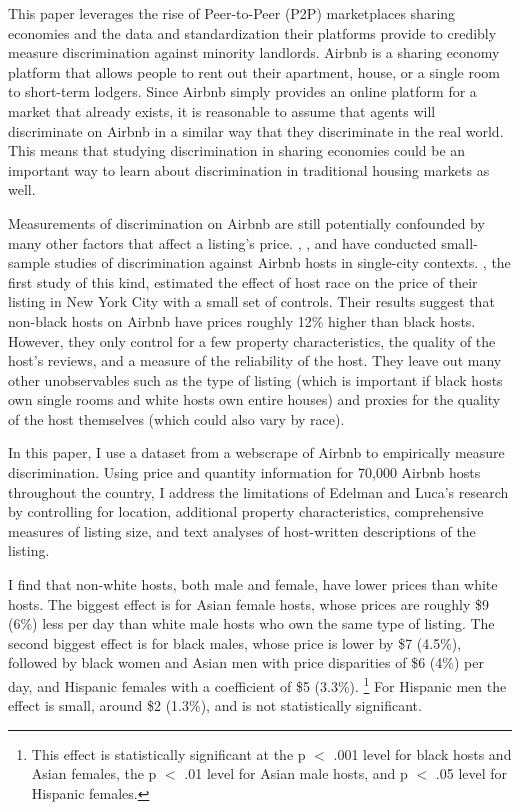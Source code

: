 This paper leverages the rise of Peer-to-Peer (P2P) marketplaces sharing economies and the data and standardization their platforms provide to credibly measure discrimination against minority landlords. Airbnb is a sharing economy platform that allows people to rent out their apartment, house, or a single room to short-term lodgers. Since Airbnb simply provides an online platform for a market that already exists, it is reasonable to assume that agents will discriminate on Airbnb in a similar way that they discriminate in the real world. This means that studying discrimination in sharing economies could be an important way to learn about discrimination in traditional housing markets as well.

Measurements of discrimination on Airbnb are still potentially confounded by many other factors that affect a listing's price. \cite{edelman}, \cite{wang}, and \cite{kakar} have conducted small-sample studies of discrimination against Airbnb hosts in single-city contexts. \cite{edelman}, the first study of this kind, estimated the effect of host race on the price of their listing in New York City with a small set of controls. Their results suggest that non-black hosts on Airbnb have prices roughly 12\% higher than black hosts. However, they only control for a few property characteristics, the quality of the host's reviews, and a measure of the reliability of the host. They leave out many other unobservables such as the type of listing (which is important if black hosts own single rooms and white hosts own entire houses) and proxies for the quality of the host themselves (which could also vary by race). 

In this paper, I use a dataset from a webscrape of Airbnb to empirically measure discrimination. Using price and quantity information for 70,000 Airbnb hosts throughout the country, I address the limitations of Edelman and Luca's research by controlling for location, additional property characteristics, comprehensive measures of listing size, and text analyses of host-written descriptions of the listing. 

I find that non-white hosts, both male and female, have lower prices than white hosts. The biggest effect is for Asian female hosts, whose prices are roughly \$9 (6\%) less per day than white male hosts who own the same type of listing. The second biggest effect is for black males, whose price is lower by \$7 (4.5\%), followed by black women and Asian men with price disparities of \$6 (4\%) per day, and Hispanic females with a coefficient of \$5 (3.3\%).%
	\footnote{This effect is statistically significant at the p $<$ .001 level for black hosts and Asian females, the p $<$ .01 level for Asian male hosts, and p $<$ .05 level for Hispanic females.} 
For Hispanic men the effect is small, around \$2 (1.3\%), and is not statistically significant. 

